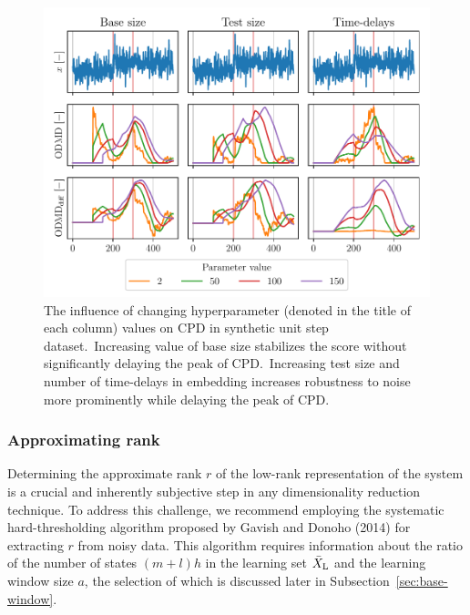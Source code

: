 \begin{figure}[H]
	\centering
	\includegraphics[width=\linewidth]{figures/Unit-step-parameters-influence-ref_size_test_size_hn.pdf}
	\caption{The influence of changing hyperparameter (denoted in the title of each column) values on CPD in synthetic unit step dataset.~Increasing value of base size stabilizes the score without significantly delaying the peak of CPD.~Increasing test size and number of time-delays in embedding increases robustness to noise more prominently while delaying the peak of CPD.}\label{fig:hyperparameters}
\end{figure}

\subsubsection{Approximating rank}
Determining the approximate rank \( r \) of the low-rank representation of the system is a crucial and inherently subjective step in any dimensionality reduction technique. To address this challenge, we recommend employing the systematic hard-thresholding algorithm proposed by Gavish and Donoho (2014) for extracting \( r \) from noisy data. This algorithm requires information about the ratio of the number of states \((m + l) h\) in the learning set \(\bar{X} _{\text{L}}\) and the learning window size \(a\), the selection of which is discussed later in Subsection~\ref{sec:base-window}.

